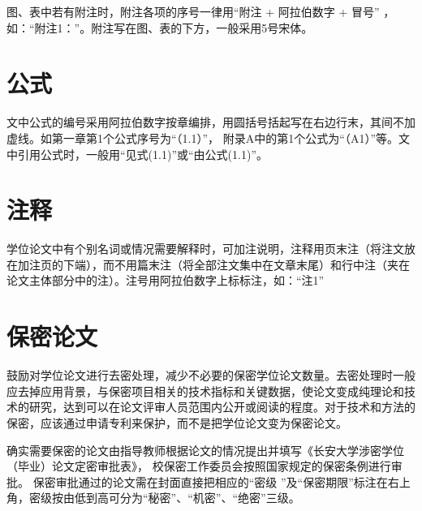 图、表中若有附注时，附注各项的序号一律用“附注 + 阿拉伯数字 + 冒号” ，如：“附注1：”。附注写在图、表的下方，一般采用5号宋体。

\section{公式}

文中公式的编号采用阿拉伯数字按章编排，用圆括号括起写在右边行末，其间不加虚线。如第一章第1个公式序号为“（1.1）”， 附录A中的第1个公式为“（A1）”等。文中引用公式时，一般用“见式(1.1)”或“由公式(1.1)”。

\section{注释}

学位论文中有个别名词或情况需要解释时，可加注说明，注释用页末注（将注文放在加注页的下端），而不用篇末注（将全部注文集中在文章末尾）和行中注（夹在论文主体部分中的注）。注号用阿拉伯数字上标标注，如：“注1”

\section{保密论文}

鼓励对学位论文进行去密处理，减少不必要的保密学位论文数量。去密处理时一般应去掉应用背景，与保密项目相关的技术指标和关键数据，使论文变成纯理论和技术的研究，达到可以在论文评审人员范围内公开或阅读的程度。对于技术和方法的保密，应该通过申请专利来保护，而不是把学位论文变为保密论文。

确实需要保密的论文由指导教师根据论文的情况提出并填写《长安大学涉密学位（毕业）论文定密审批表》，
校保密工作委员会按照国家规定的保密条例进行审批。
保密审批通过的论文需在封面直接把相应的“密级  %
”及“保密期限”标注在右上角，密级按由低到高可分为“秘密”、“机密”、“绝密”三级。
